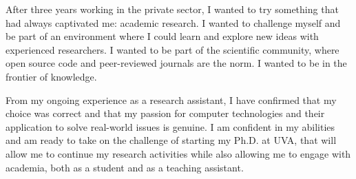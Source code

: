 After three years working in the private sector, I wanted to try something that had always captivated me: academic research. I wanted to challenge myself and be part of an environment where I could learn and explore new ideas with experienced researchers. I wanted to be part of the scientific community, where open source code and peer-reviewed journals are the norm. I wanted to be in the frontier of knowledge.

From my ongoing experience as a research assistant, I have confirmed that my choice was correct and that my passion for computer technologies and their application to solve real-world issues is genuine. I am confident in my abilities and am ready to take on the challenge of starting my Ph.D. at UVA, that will allow me to continue my research activities while also allowing me to engage with academia, both as a student and as a teaching assistant.